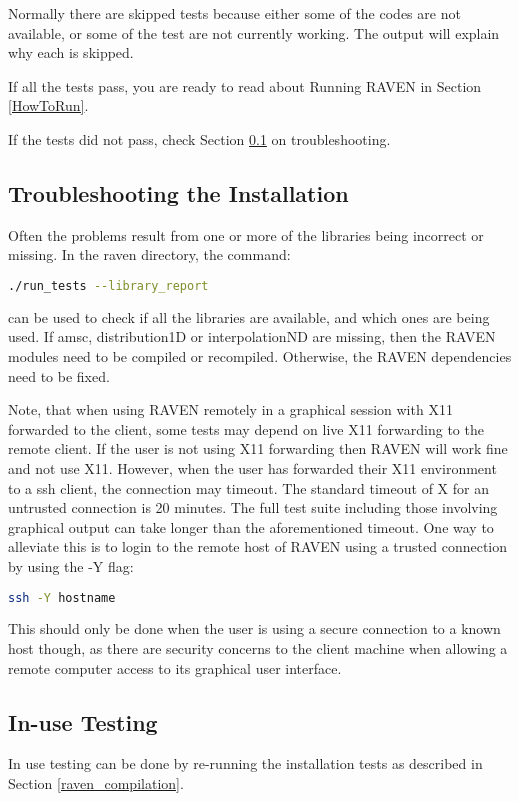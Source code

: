 Normally there are skipped tests because either some of the codes are
not available, or some of the test are not currently working.  The
output will explain why each is skipped.

If all the tests pass, you are ready to read about Running RAVEN in
Section \ref{HowToRun}.

If the tests did not pass, check Section
\ref{troubleshooting_installation} on troubleshooting.

\subsection{Troubleshooting the Installation}
\label{troubleshooting_installation}

Often the problems result from one or more of the libraries being
incorrect or missing.  In the raven directory, the command:

\begin{lstlisting}[language=bash]
./run_tests --library_report
\end{lstlisting}
can be used to check if all the libraries are available, and which
ones are being used.  If amsc, distribution1D or interpolationND are
missing, then the RAVEN modules need to be compiled or recompiled.
Otherwise, the RAVEN dependencies need to be fixed.

Note, that when using RAVEN remotely in a graphical session with X11
forwarded to the client, some tests may depend on live X11 forwarding
to the remote client. If the user is not using X11 forwarding then
RAVEN will work fine and not use X11.  However, when the user has
forwarded their X11 environment to a ssh client, the connection may
timeout. The standard timeout of X for an untrusted connection is 20
minutes.  The full test suite including those involving graphical
output can take longer than the aforementioned timeout. One way to
alleviate this is to login to the remote host of RAVEN using a trusted
connection by using the -Y flag:

\begin{lstlisting}[language=bash]
ssh -Y hostname
\end{lstlisting}

This should only be done when the user is using a secure connection to
a known host though, as there are security concerns to the client
machine when allowing a remote computer access to its graphical user
interface.


\subsection{In-use Testing}

In use testing can be done by re-running the installation tests as
described in Section \ref{raven_compilation}.
